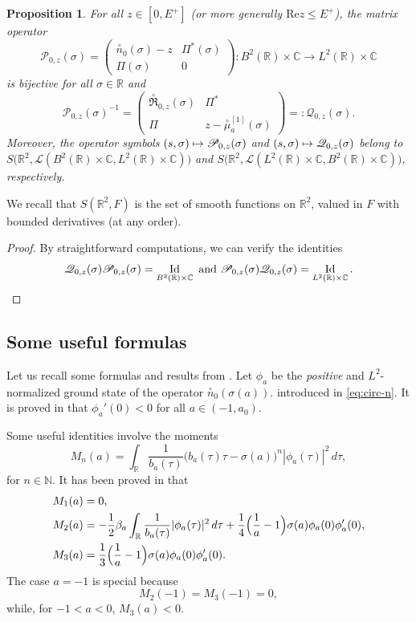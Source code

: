 \documentclass[JEP,XML,SOM,Unicode,NoFloatCountersInSection,published]{cedram}
\newcommand\mto{\mathchoice{\longmapsto}{\mapsto}{\mapsto}{\mapsto}}
\DeclareMathOperator{\Id}{Id}
\theoremstyle{plain}
\newtheorem{proposition}[theorem]{Proposition}
\theoremstyle{definition}
\newcommand{\R}{\mathbb{R}}
\newcommand{\C}{\mathbb{C}}
\renewcommand{\Re}{\mathrm{Re}}
\begin{document}
\begin{proposition}\label{prop.Grushin0}
For all $ z\in [0,E^+]$ (or more generally $\Re z\leq E^+$), the matrix operator
\[
\mathscr{P}_{0,z}(\sigma)=\begin{pmatrix}
\overset{\circ}{n}_0(\sigma)-z&\Pi^*(\sigma)\\
\Pi(\sigma)&0
\end{pmatrix} : B^2(\R)\times\C\to L^2(\R)\times\C
\]
is bijective for all $\sigma\in\R$ and
\[
\mathscr{P}_{0,z}(\sigma)^{-1}=\begin{pmatrix}
\overset{\circ}{\mathfrak R}_{0,z}(\sigma)&\Pi^*\\
\Pi&z-\overset{\circ}{\mu}^{[1]}_a(\sigma)
\end{pmatrix}=:\mathscr{Q}_{0,z}(\sigma).
\]
Moreover, the operator symbols $(s,\sigma) \mto \mathscr{P}_{0,z}(\sigma)$ and $(s,\sigma) \mto \mathscr{Q}_{0,z}(\sigma)$ belong to $S\bigl(\R^2,\mathscr{L}(B^2(\R)\times\C, L^2(\R)\times\C)\bigr)$ and $
S\bigl(\R^2,\mathscr{L}(L^2(\R)\times\C, B^2(\R)\times\C)\bigr)$, respectively.
\end{proposition}
We recall that $S(\R^2,F)$ is the set of smooth functions on $\R^2$, valued in $F$ with bounded derivatives (at any order).

\begin{proof}
By straightforward computations, we can verify the identities
\begin{equation*}
\mathscr Q_{0,z}(\sigma)\mathscr P_{0,z}(\sigma)=\Id_{B^2(\R)\times \C} \mbox{ and } \mathscr P_{0,z}(\sigma)\mathscr Q_{0,z}(\sigma)=\Id_{L^2(\R)\times\C}.\qedhere
\end{equation*}
\end{proof}

\subsection{Some useful formulas}\label{sec:uf}
Let us recall some formulas and results from \cite{AK20}. Let $\phi_a$ be the \emph{positive} and $L^2$-normalized ground state of the operator $\overset{\circ}{n}_0(\sigma(a))$. introduced in \eqref{eq:circ-n}. It is proved in \cite[Th.\,1.1]{AK20} that $\phi_a'(0)<0$ for all $a\in(-1,a_0)$.

Some useful identities involve the moments
\begin{equation}\label{eq:moments}
M_n(a)=\int_{\mathbb R}\frac 1{b_a(\tau)}\bigl(b_a(\tau)\tau-\sigma(a)\bigr)^n|\phi_a(\tau)|^2\,d\tau, \end{equation}
for $n\in \mathbb N $.
It has been proved in \cite{AK20} that
\begin{align}
M_1(a)&=0,\label{eq:m1}\\
M_2(a)&=-\frac 12 \beta_a\int_{\mathbb R}\frac 1{b_a(\tau)}|\phi_a(\tau)|^2\,d\tau+\frac 14\Bigl(\frac 1a-1\Bigr)\sigma(a)\phi_a(0)\phi_a'(0), \label{eq:m2}\\
M_3(a)&=\frac 13\Bigl(\frac 1a-1\Bigr)\sigma(a)\phi_a(0)\phi_a'(0).\label{eq:m3*}
\end{align}
The case $a=-1$ is special because
\[
M_2(-1)=M_3(-1)=0,
\]
while, for $-1<a<0$, $M_3(a)<0$.
\end{document}
